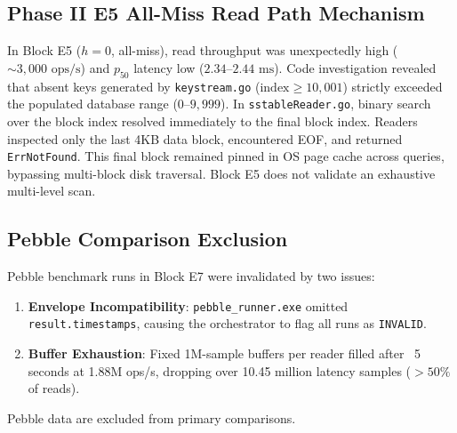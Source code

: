 \documentclass[conference]{IEEEtran}
\begin{document}
\subsection{Phase II E5 All-Miss Read Path Mechanism}
In Block E5 ($h=0$, all-miss), read throughput was unexpectedly high ($\sim 3,000\text{ ops/s}$) and $p_{50}$ latency low ($2.34\text{--}2.44\text{ ms}$). Code investigation revealed that absent keys generated by \texttt{keystream.go} ($\text{index} \ge 10,001$) strictly exceeded the populated database range ($0\text{--}9,999$). In \texttt{sstableReader.go}, binary search over the block index resolved immediately to the final block index. Readers inspected only the last 4KB data block, encountered EOF, and returned \texttt{ErrNotFound}. This final block remained pinned in OS page cache across queries, bypassing multi-block disk traversal. Block E5 does not validate an exhaustive multi-level scan.

\subsection{Pebble Comparison Exclusion}
Pebble benchmark runs in Block E7 were invalidated by two issues:
\begin{enumerate}
    \item \textbf{Envelope Incompatibility}: \texttt{pebble\_runner.exe} omitted \texttt{result.timestamps}, causing the orchestrator to flag all runs as \texttt{INVALID}.
    \item \textbf{Buffer Exhaustion}: Fixed 1M-sample buffers per reader filled after ~5 seconds at 1.88M ops/s, dropping over 10.45 million latency samples ($>50\%$ of reads).
\end{enumerate}
Pebble data are excluded from primary comparisons.
\end{document}
